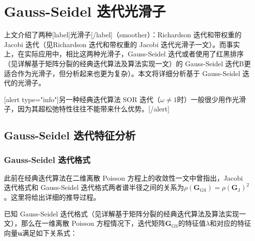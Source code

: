 \documentclass[12pt, UTF8, nofonts]{ctexart}
\begin{document}

\section*{Gauss-Seidel 迭代光滑子}

上文介绍了两种[label]光滑子[/label]（smoother）：Richardson 迭代和带权重的 Jacobi 迭代（见Richardson 迭代和带权重的 Jacobi 迭代光滑子一文）。而事实上，在实际应用中，相比这两种光滑子，Gauss-Seidel 迭代或者使用了红黑排序（见详解基于矩阵分裂的经典迭代算法及算法实现一文）的 Gauss-Seidel 迭代B更适合作为光滑子，但分析起来也更为复杂）。本文将详细分析基于 Gauss-Seidel 迭代的光滑子。

[alert type="info"]另一种经典迭代算法 SOR 迭代（$\omega\neq1$时）一般很少用作光滑子，因为其超松弛特性往往不能带来什么优势。[/alert]

\subsection*{Gauss-Seidel 迭代特征分析}

\subsubsection*{Gauss-Seidel 迭代格式}

此前在经典迭代算法在二维离散 Poisson 方程上的收敛性一文中曾指出，Jacobi 迭代格式和 Gauss-Seidel 迭代格式两者谱半径之间的关系为$\rho(\boldsymbol{G}_{\mathrm{GS}})=\rho(\boldsymbol{G}_{\mathrm{J}})^2$。这里将给出详细的推导过程。

已知 Gauss-Seidel 迭代格式（见详解基于矩阵分裂的经典迭代算法及算法实现一文），那么在一维离散 Poisson 方程情况下，迭代矩阵$\boldsymbol{G}_{\mathrm{GS}}$的特征值$\lambda$和对应的特征向量$\boldsymbol{u}$满足如下关系式：
\end{document}
